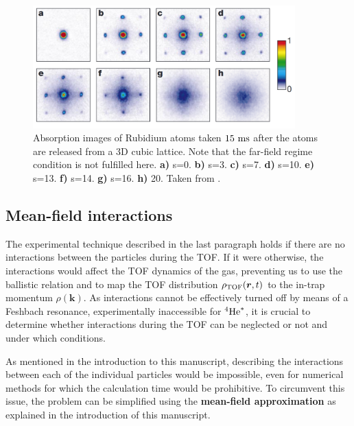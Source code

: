 \begin{figure}
    \centering
    \includegraphics[width=0.9\textwidth]{Fig/Chapter2/mott_greiner.png}
    \caption[Absorption images of Rubidium atoms across the Mott transition]{Absorption images of Rubidium atoms taken $15 \ \rm{ms}$ after the atoms are released from a 3D cubic lattice. Note that the far-field regime condition is not fulfilled here. \textbf{a)} s=0. \textbf{b)} s=3. \textbf{c)} s=7. \textbf{d)} s=10. \textbf{e)} s=13. \textbf{f)} s=14. \textbf{g)} s=16. \textbf{h)} 20. Taken from \cite{greiner2002quantum}.}
    \label{fig:mott_greiner}
\end{figure}


\subsection{Mean-field interactions}

The experimental technique described in the last paragraph holds if there are no interactions between the particles during the TOF. If it were otherwise, the interactions would affect the TOF dynamics of the gas, preventing us to use the ballistic relation and to map the TOF distribution $\rho_{\rm{TOF}}(\bm{r},t)$ to the in-trap momentum $\rho(\bm{k})$. As interactions cannot be effectively turned off by means of a Feshbach resonance, experimentally inaccessible for $^4 \mathrm{He}^*$, it is crucial to determine whether interactions during the TOF can be neglected or not and under which conditions.

As mentioned in the introduction to this manuscript, describing the interactions between each of the individual particles would be impossible, even for numerical methods for which the calculation time would be prohibitive. To circumvent this issue, the problem can be simplified using the \textbf{mean-field approximation} as explained in the introduction of this manuscript.

